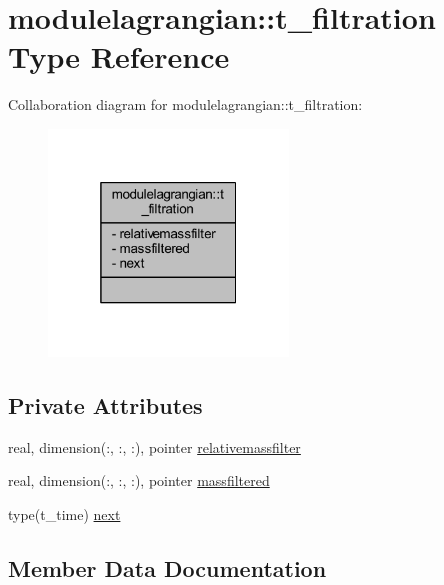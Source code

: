 \hypertarget{structmodulelagrangian_1_1t__filtration}{}\section{modulelagrangian\+:\+:t\+\_\+filtration Type Reference}
\label{structmodulelagrangian_1_1t__filtration}


Collaboration diagram for modulelagrangian\+:\+:t\+\_\+filtration\+:\nopagebreak
\begin{figure}[H]
\begin{center}
\leavevmode
\includegraphics[width=181pt]{structmodulelagrangian_1_1t__filtration__coll__graph}
\end{center}
\end{figure}
\subsection*{Private Attributes}
\begin{DoxyCompactItemize}
\item 
real, dimension(\+:, \+:, \+:), pointer \mbox{\hyperlink{structmodulelagrangian_1_1t__filtration_af69b142f063ee712858bf255cb310905}{relativemassfilter}}
\item 
real, dimension(\+:, \+:, \+:), pointer \mbox{\hyperlink{structmodulelagrangian_1_1t__filtration_a6bc765eb9f73007b1eb649422cd2b495}{massfiltered}}
\item 
type(t\+\_\+time) \mbox{\hyperlink{structmodulelagrangian_1_1t__filtration_ae30c10db08fa89805e61444f8dd13215}{next}}
\end{DoxyCompactItemize}


\subsection{Member Data Documentation}
\mbox{\label{structmodulelagrangian_1_1t__filtration_a6bc765eb9f73007b1eb649422cd2b495}} 
